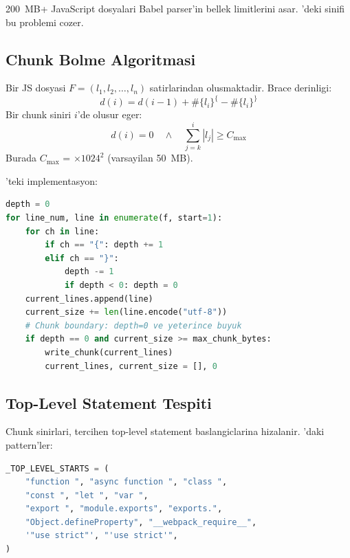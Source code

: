 200~MB+ JavaScript dosyalari Babel parser'in bellek limitlerini asar. 'deki  sinifi bu problemi cozer.

\subsection{Chunk Bolme Algoritmasi}

\begin{tanim}
Bir JS dosyasi $F = (l_1, l_2, \ldots, l_n)$ satirlarindan olusmaktadir. Brace derinligi:
\begin{equation}
\label{eq:brace-depth}
d(i) = d(i-1) + \#\{l_i\}^{\texttt{\{}} - \#\{l_i\}^{\texttt{\}}}
\end{equation}
Bir chunk siniri $i$'de olusur eger:
\begin{equation}
\label{eq:chunk-boundary}
d(i) = 0 \quad \wedge \quad \sum_{j=k}^{i} |l_j| \geq C_{\max}
\end{equation}
Burada $C_{\max}$ =  $\times 1024^2$ (varsayilan 50~MB).
\end{tanim}

'teki implementasyon:

\begin{lstlisting}[language=Python, caption={Brace-aware chunking}]
depth = 0
for line_num, line in enumerate(f, start=1):
    for ch in line:
        if ch == "{": depth += 1
        elif ch == "}":
            depth -= 1
            if depth < 0: depth = 0
    current_lines.append(line)
    current_size += len(line.encode("utf-8"))
    # Chunk boundary: depth=0 ve yeterince buyuk
    if depth == 0 and current_size >= max_chunk_bytes:
        write_chunk(current_lines)
        current_lines, current_size = [], 0
\end{lstlisting}

\subsection{Top-Level Statement Tespiti}

Chunk sinirlari, tercihen top-level statement baslangiclarina hizalanir. 'daki pattern'ler:

\begin{lstlisting}[language=Python, caption={Top-level statement pattern'leri}]
_TOP_LEVEL_STARTS = (
    "function ", "async function ", "class ",
    "const ", "let ", "var ",
    "export ", "module.exports", "exports.",
    "Object.defineProperty", "__webpack_require__",
    '"use strict"', "'use strict'",
)
\end{lstlisting}

